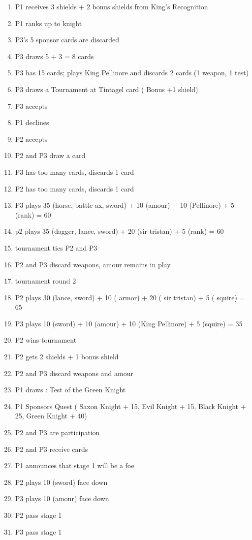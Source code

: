 \documentclass[a4paper,11pt]{article}
\begin{document}
\begin{enumerate}
\item P1 receives 3 shields + 2 bonus shields from King’s Recognition
\item P1 ranks up to knight 
\item P3’s 5 sponsor cards are discarded
\item P3 draws 5 + 3 = 8 cards
\item P3 has 15 cards; plays King Pellinore and discards 2 cards (1 weapon, 1 test)
\item P3 draws a Tournament at Tintagel card ( Bonus +1 shield)
\item P3 accepts
\item P1 declines
\item P2 accepts
\item P2 and P3 draw a card
\item P3 has too many cards, discards 1 card 
\item P2 has too many cards, discards 1 card 
\item P3 plays 35 (horse, battle-ax, sword) + 10 (amour) + 10 (Pellinore) + 5 (rank) = 60
\item p2 plays 35 (dagger, lance, sword)  + 20 (sir tristan) + 5 (rank) = 60
\item tournament ties P2 and P3
\item P2 and P3 discard weapons, amour remains in play
\item tournament round 2
\item P2 plays 30 (lance, sword) + 10 ( armor) + 20 ( sir tristan) + 5 ( squire) = 65 
\item P3 plays 10 (sword) + 10 (amour) + 10 (King Pellinore) + 5 (squire) = 35
\item P2 wins tournament
\item P2 gets 2 shields + 1 bonus shield
\item P2 and P3 discard weapons and amour
\item P1 draws : Test of the Green Knight
\item P1 Sponsors Quest ( Saxon Knight + 15, Evil Knight + 15, Black Knight + 25, Green Knight + 40) 
\item P2 and P3 are participation 
\item P2 and P3 receive cards
\item P1 announces that stage 1 will be a foe
\item P2 plays 10 (sword) face down
\item P3 plays 10 (amour) face down
\item P2  pass stage 1 
\item P3  pass stage 1

\end{enumerate}
\end{document}
